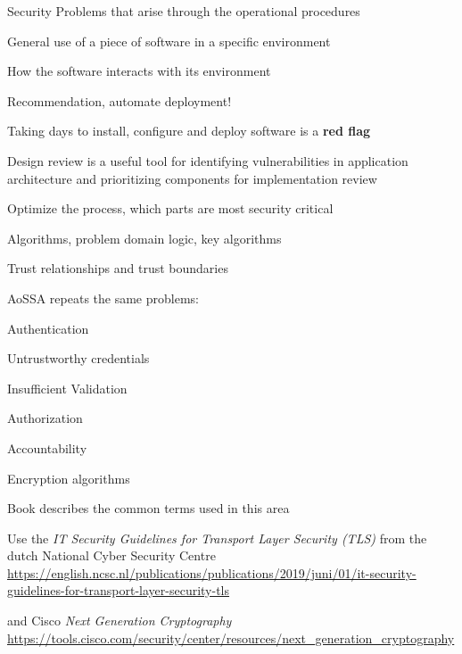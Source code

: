 \documentclass[Screen16to9,17pt]{foils}
\begin{document}

\begin{list2}
\item Security Problems that arise through the operational procedures
\item General use of a piece of software in a specific environment
\item How the software interacts with its environment
\item Recommendation, automate deployment!
\item Taking days to install, configure and deploy software is a {\bf red flag}
\end{list2}



\begin{list2}
\item Design review is a useful tool for identifying vulnerabilities in application architecture and prioritizing components for implementation review
\item Optimize the process, which parts are most security critical
\item Algorithms, problem domain logic, key algorithms
\item Trust relationships and trust boundaries
\end{list2}



\begin{list2}
\item AoSSA repeats the same problems:
\item Authentication
\item Untrustworthy credentials
\item Insufficient Validation
\item Authorization
\item Accountability
\end{list2}



\begin{list2}
\item Encryption algorithms
\item Book describes the common terms used in this area
\item Use the \emph{IT Security Guidelines for Transport Layer Security (TLS)} from the dutch National Cyber Security Centre\\
{\footnotesize\url{https://english.ncsc.nl/publications/publications/2019/juni/01/it-security-guidelines-for-transport-layer-security-tls}}

\item and Cisco \emph{Next Generation Cryptography}\\
{\footnotesize\url{https://tools.cisco.com/security/center/resources/next_generation_cryptography}}
\end{list2}
\end{document}
